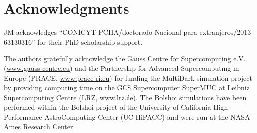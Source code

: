 \documentclass{emulateapj}
\begin{document}
\section*{Acknowledgments} 

JM acknowledges ``CONICYT-PCHA/doctorado Nacional para
extranjeros/2013-63130316'' for their PhD scholarship support.  

The authors gratefully acknowledge the Gauss Centre for Supercomputing
e.V. (\url{www.gauss-centre.eu}) and the Partnership for Advanced
Supercomputing in Europe (PRACE, \url{www.prace-ri.eu}) for funding the
MultiDark simulation project by providing computing time on the GCS
Supercomputer SuperMUC at Leibniz Supercomputing Centre (LRZ,
\url{www.lrz.de}). The Bolshoi simulations have been performed within the
Bolshoi project of the University of California High-Performance
AstroComputing Center (UC-HiPACC) and were run at the NASA Ames
Research Center. 




\end{document}
